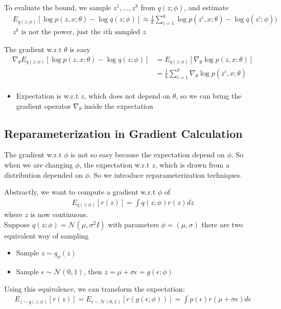 To evaluate the bound, we sample $z^1, ..., z^k$ from $q(z;\phi)$, and estimate 
    \begin{align*}
        & E_{q(z;\phi)}[\log p(z,x;\theta) - \log q(z;\phi)] \approx \frac{1}{k}\sum_{i=1}^k \log p(z^i,x;\theta) - \log q(z^i; \phi)) \\
        & \textrm{$z^k$ is not the power, just the $i$th sampled $z$}
    \end{align*}
    
The gradient w.r.t $\theta$ is easy
\begin{align*}
    \nabla_\theta E_{q(z;\phi)}[\log p(z,x;\theta) - \log q(z;\phi)] 
    & = E_{q(z;\phi)}[\nabla_\theta \log p(z,x;\theta)]\\
    & = \frac{1}{k}\sum_{i=1}^k \nabla_\theta \log p(z^i,x;\theta) \tag{Monte Carlo again}\\
\end{align*}
    \begin{itemize}
        \item Expectation is w.r.t $z$, which does not depend on $\theta$, so we can bring the gradient operator $\nabla_\theta$ inside the expectation\\
    \end{itemize}
    
    
\subsection{Reparameterization in Gradient Calculation}
The gradient w.r.t $\phi$ is not so easy because the expectation depend on $\phi$. So when we are changing $\phi$, the expectation w.r.t $z$, which is drawn from a distribution depended on $\phi$. So we introduce reparameterization techniques. \\ \par

Abstractly, we want to compute a gradient w.r.t $\phi$ of 
    \begin{align*}
        E_{q(z;\phi)}[r(z)] = \int q(z;\phi) r(z) dz
    \end{align*}
where $z$ is now continuous. \\
Suppose $q(z;\phi) = \mathcal{N}(\mu, \sigma^2I)$ with parameters $\phi = (\mu, \sigma)$ there are two equivalent way of sampling 
    \begin{itemize}
        \item Sample $z\sim q_\phi(z)$
        \item Sample $\epsilon \sim \mathcal{N}(0,1)$, then $z = \mu + \sigma \epsilon = g(\epsilon;\phi)$
    \end{itemize}
Using this equivalence, we can transform the expectation: 
    \begin{align*}
         E_{z\sim q(z;\phi)}[r(z)] = E_{\epsilon \sim \mathcal{N}(0,1)}[r(g(\epsilon;\phi))] = \int p(\epsilon) r(\mu + \sigma \epsilon) d\epsilon 
    \end{align*}

